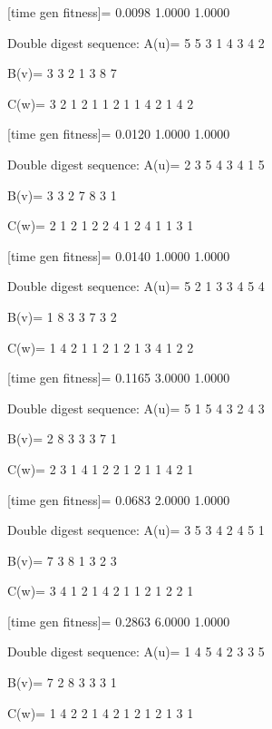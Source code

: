 [time gen fitness]=
    0.0098    1.0000    1.0000

Double digest sequence:
A(u)=
     5     5     3     1     4     3     4     2

B(v)=
     3     3     2     1     3     8     7

C(w)=
     3     2     1     2     1     1     2     1     1     4     2     1     4     2

[time gen fitness]=
    0.0120    1.0000    1.0000

Double digest sequence:
A(u)=
     2     3     5     4     3     4     1     5

B(v)=
     3     3     2     7     8     3     1

C(w)=
     2     1     2     1     2     2     4     1     2     4     1     1     3     1

[time gen fitness]=
    0.0140    1.0000    1.0000

Double digest sequence:
A(u)=
     5     2     1     3     3     4     5     4

B(v)=
     1     8     3     3     7     3     2

C(w)=
     1     4     2     1     1     2     1     2     1     3     4     1     2     2

[time gen fitness]=
    0.1165    3.0000    1.0000

Double digest sequence:
A(u)=
     5     1     5     4     3     2     4     3

B(v)=
     2     8     3     3     3     7     1

C(w)=
     2     3     1     4     1     2     2     1     2     1     1     4     2     1

[time gen fitness]=
    0.0683    2.0000    1.0000

Double digest sequence:
A(u)=
     3     5     3     4     2     4     5     1

B(v)=
     7     3     8     1     3     2     3

C(w)=
     3     4     1     2     1     4     2     1     1     2     1     2     2     1

[time gen fitness]=
    0.2863    6.0000    1.0000

Double digest sequence:
A(u)=
     1     4     5     4     2     3     3     5

B(v)=
     7     2     8     3     3     3     1

C(w)=
     1     4     2     2     1     4     2     1     2     1     2     1     3     1

